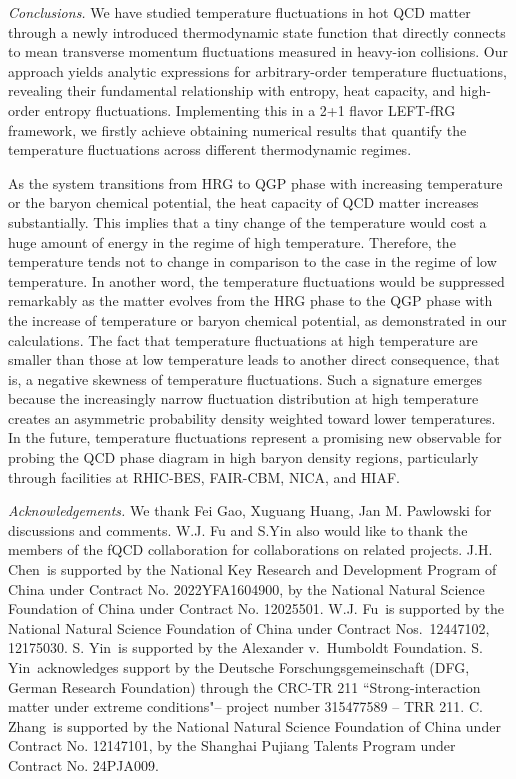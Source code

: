 \documentclass[aps,twocolumn,
prl,
superscriptaddress,nofootinbib,floatfix]{revtex4-2}
\begin{document}
\textit{Conclusions.}\label{sec:conclusion} We have studied temperature fluctuations in hot QCD matter through a newly introduced thermodynamic state function that directly connects to mean transverse momentum fluctuations measured in heavy-ion collisions. Our approach yields analytic expressions for arbitrary-order temperature fluctuations, revealing their fundamental relationship with entropy, heat capacity, and high-order entropy fluctuations.  Implementing this in a 2+1 flavor LEFT-fRG framework, we firstly achieve obtaining numerical results that quantify the temperature fluctuations across different thermodynamic regimes.

As the system transitions from HRG to QGP phase with increasing temperature or the baryon chemical potential, the heat capacity of QCD matter increases substantially. This implies that a tiny change of the temperature would cost a huge amount of energy in the regime of high temperature. Therefore, the temperature tends not to change in comparison to the case in the regime of low temperature. In another word, the temperature fluctuations would be suppressed remarkably as the matter evolves from the HRG phase to the QGP phase with the increase of temperature or baryon chemical potential, as demonstrated in our calculations. The fact that temperature fluctuations at high temperature are smaller than those at low temperature leads to another direct consequence, that is, a negative skewness of temperature fluctuations. Such a signature emerges because the increasingly narrow fluctuation distribution at high temperature creates an asymmetric probability density weighted toward lower temperatures. In the future, temperature fluctuations represent a promising new observable for probing the QCD phase diagram in high baryon density regions, particularly through facilities at RHIC-BES, FAIR-CBM, NICA, and HIAF.



\textit{Acknowledgements.} We thank Fei Gao,  Xuguang Huang, Jan M. Pawlowski for discussions and comments. W.J. Fu and S.Yin also would like to thank the members of the fQCD collaboration \cite{fQCD} for collaborations on related projects.
J.H. Chen\ is supported by the National Key Research and Development Program of China under Contract No. 2022YFA1604900, by the National Natural Science Foundation of China under Contract No. 12025501.
W.J. Fu\ is supported by the National Natural Science Foundation of China under Contract Nos.\ 12447102, 12175030. 
S. Yin\ is supported by the Alexander v.\ Humboldt Foundation. 
S. Yin\ acknowledges support by the Deutsche Forschungsgemeinschaft (DFG, German Research Foundation) through the CRC-TR 211 ``Strong-interaction matter under extreme conditions"– project number 315477589 – TRR 211.
C. Zhang\ is supported by the National Natural Science Foundation of China under Contract No. 12147101, by the Shanghai Pujiang Talents Program under Contract No. 24PJA009.

% 

\vfill 

\end{document}
